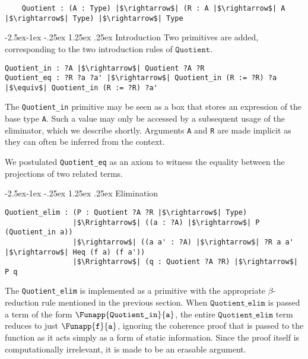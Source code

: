 \documentclass[12pt,twoside,maitrise]{dms}
\makeatletter
\theoremstyle{definition}
\numberwithin{equation}{section}
\numberwithin{table}{chapter}
\numberwithin{figure}{chapter}
\newcommand\id[1] {\texttt{#1}}
\renewcommand\paragraph{\@startsection{paragraph}{4}{\z@}%
            {-2.5ex\@plus -1ex \@minus -.25ex}%
            {1.25ex \@plus .25ex}%
            {\normalfont\normalsize\bfseries}}
\makeatother
\begin{document}
\begin{verbatim}
    Quotient : (A : Type) |$\rightarrow$| (R : A |$\rightarrow$| A |$\rightarrow$| Type) |$\rightarrow$| Type
\end{verbatim}

\paragraph{Introduction}
Two primitives are added, corresponding to the two introduction rules of $\id{Quotient}$.

\begin{verbatim}
Quotient_in : ?A |$\rightarrow$| Quotient ?A ?R
Quotient_eq : ?R ?a ?a' |$\rightarrow$| Quotient_in (R := ?R) ?a |$\equiv$| Quotient_in (R := ?R) ?a'
\end{verbatim}

The \id{Quotient\_in} primitive may be seen as a box that stores an expression
of the base type \id{A}. Such a value may only be accessed by a subsequent usage
of the eliminator, which we describe shortly. Arguments \id{A} and \id{R} are
made implicit as they can often be inferred from the context.

We postulated \id{Quotient\_eq} as an axiom to witness the equality between the
projections of two related terms.

\paragraph{Elimination}

\begin{verbatim}
Quotient_elim : (P : Quotient ?A ?R |$\rightarrow$| Type)
                |$\Rrightarrow$| ((a : ?A) |$\rightarrow$| P (Quotient_in a))
                |$\rightarrow$| ((a a' : ?A) |$\rightarrow$| ?R a a' |$\rightarrow$| Heq (f a) (f a'))
                |$\Rrightarrow$| (q : Quotient ?A ?R) |$\rightarrow$| P q
\end{verbatim}

The \id{Quotient\_elim} is implemented as a primitive with the appropriate
$\beta$-reduction rule mentioned in the previous section. When
$\id{Quotient\_elim}$ is passed a term of the form
$\Funapp{\id{Quotient\_in}}{\id{a}}$, the entire $\id{Quotient\_elim}$ term
reduces to just $\Funapp{\id{f}}{\id{a}}$, ignoring the coherence proof that is
passed to the function as it acts simply as a form of static information. Since
the proof itself is computationally irrelevant, it is made to be an erasable
argument.
\end{document}
